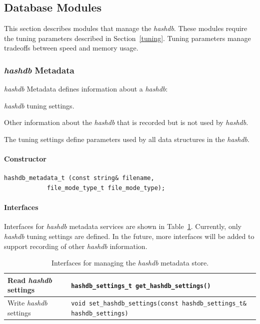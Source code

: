\documentclass[12pt,twoside]{article}
\newcommand{\hdb}{\emph{hashdb}\xspace}
\begin{document}
\subsection{Database Modules}
This section describes modules that manage the \hdb.
These modules require the tuning parameters described in Section~\ref{tuning}.
Tuning parameters manage tradeoffs between speed and memory usage.

\subsubsection{\hdb Metadata}
\hdb Metadata defines information about a \hdb:
\begin{compactitem}
\item \hdb tuning settings.
\item Other information about the \hdb that is recorded but is not used by \hdb.
\end{compactitem}
The tuning settings define parameters used by all data structures in the \hdb.
\paragraph{Constructor}
\begin{small}
\begin{verbatim}
hashdb_metadata_t (const string& filename,
            file_mode_type_t file_mode_type);
\end{verbatim}
\end{small}

\paragraph{Interfaces}
Interfaces for \hdb metadata services
are shown in Table~\ref{hashdb-metadata-interfaces}.
Currently, only \hdb tuning settings are defined.
In the future, more interfaces will be added to support recording of other \hdb information.
\begin{table}[h]
\center
\begin{tabular}{|p{2in}|p{4in}|}
\hline
Read \hdb settings & \texttt{hashdb\_settings\_t get\_hashdb\_settings()} \\
\hline
Write \hdb settings & \texttt{void set\_hashdb\_settings(const hashdb\_settings\_t\& hashdb\_settings)} \\
\hline
\end{tabular}
\caption{Interfaces for managing the \hdb metadata store.\label{hashdb-metadata-interfaces}}
\end{table}
\end{document}

